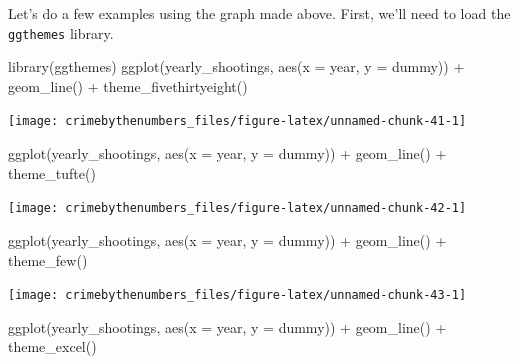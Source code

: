 \documentclass[
]{krantz}
\makeatletter
\newenvironment{Shaded}{\begin{snugshade}}{\end{snugshade}}
\newcommand{\AttributeTok}[1]{\textcolor[rgb]{0.61,0.61,0.61}{#1}}
\newcommand{\FunctionTok}[1]{\textcolor[rgb]{0,0,0}{#1}}
\newcommand{\NormalTok}[1]{#1}
\newcommand{\SpecialCharTok}[1]{\textcolor[rgb]{0,0,0}{#1}}
\newenvironment{kframe}{%
\medskip{}
\setlength{\fboxsep}{.8em}
 \def\at@end@of@kframe{}%
 \ifinner\ifhmode%
  \def\at@end@of@kframe{\end{minipage}}%
  \begin{minipage}{\columnwidth}%
 \fi\fi%
 \def\FrameCommand##1{\hskip\@totalleftmargin \hskip-\fboxsep
 \colorbox{shadecolor}{##1}\hskip-\fboxsep
     \hskip-\linewidth \hskip-\@totalleftmargin \hskip\columnwidth}%
 \MakeFramed {\advance\hsize-\width
   \@totalleftmargin\z@ \linewidth\hsize
   \@setminipage}}%
 {\par\unskip\endMakeFramed%
 \at@end@of@kframe}
\renewenvironment{Shaded}{\begin{kframe}}{\end{kframe}}
\makeatother
\begin{document}
Let's do a few examples using the graph made above. First, we'll need to load the \texttt{ggthemes} library.

\begin{Shaded}
\begin{Highlighting}[]
\FunctionTok{library}\NormalTok{(ggthemes)}
\FunctionTok{ggplot}\NormalTok{(yearly\_shootings, }\FunctionTok{aes}\NormalTok{(}\AttributeTok{x =}\NormalTok{ year, }\AttributeTok{y =}\NormalTok{ dummy)) }\SpecialCharTok{+} \FunctionTok{geom\_line}\NormalTok{() }\SpecialCharTok{+}
  \FunctionTok{theme\_fivethirtyeight}\NormalTok{()}
\end{Highlighting}
\end{Shaded}

\begin{center}\texttt{[image: crimebythenumbers\_files/figure-latex/unnamed-chunk-41-1]} \end{center}

\begin{Shaded}
\begin{Highlighting}[]
\FunctionTok{ggplot}\NormalTok{(yearly\_shootings, }\FunctionTok{aes}\NormalTok{(}\AttributeTok{x =}\NormalTok{ year, }\AttributeTok{y =}\NormalTok{ dummy)) }\SpecialCharTok{+} \FunctionTok{geom\_line}\NormalTok{() }\SpecialCharTok{+}
  \FunctionTok{theme\_tufte}\NormalTok{()}
\end{Highlighting}
\end{Shaded}

\begin{center}\texttt{[image: crimebythenumbers\_files/figure-latex/unnamed-chunk-42-1]} \end{center}

\begin{Shaded}
\begin{Highlighting}[]
\FunctionTok{ggplot}\NormalTok{(yearly\_shootings, }\FunctionTok{aes}\NormalTok{(}\AttributeTok{x =}\NormalTok{ year, }\AttributeTok{y =}\NormalTok{ dummy)) }\SpecialCharTok{+} \FunctionTok{geom\_line}\NormalTok{() }\SpecialCharTok{+}
  \FunctionTok{theme\_few}\NormalTok{()}
\end{Highlighting}
\end{Shaded}

\begin{center}\texttt{[image: crimebythenumbers\_files/figure-latex/unnamed-chunk-43-1]} \end{center}

\begin{Shaded}
\begin{Highlighting}[]
\FunctionTok{ggplot}\NormalTok{(yearly\_shootings, }\FunctionTok{aes}\NormalTok{(}\AttributeTok{x =}\NormalTok{ year, }\AttributeTok{y =}\NormalTok{ dummy)) }\SpecialCharTok{+} \FunctionTok{geom\_line}\NormalTok{() }\SpecialCharTok{+}
  \FunctionTok{theme\_excel}\NormalTok{()}
\end{Highlighting}
\end{Shaded}
\end{document}
